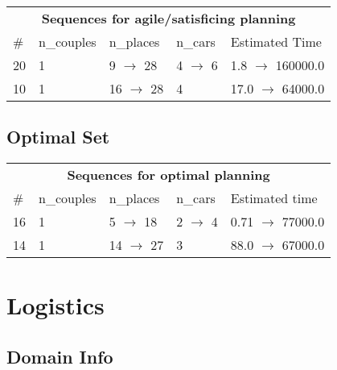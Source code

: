 \documentclass{article}
\begin{document}
                        \begin{center}
                        \begin{tabular}{l|l|l|l|l}
                        \multicolumn{5}{c}{\bf \large Sequences for agile/satisficing planning}\\
                        \# & n\_couples & n\_places & n\_cars & Estimated Time\\\midrule
                        20&1&9 $\rightarrow$ 28&4 $\rightarrow$ 6&1.8 $\rightarrow$ 160000.0\\
10&1&16 $\rightarrow$ 28&4&17.0 $\rightarrow$ 64000.0
                        \end{tabular}
                        \end{center}
                    
                            \subsection*{Optimal Set}

                            \begin{center}
                            \begin{tabular}{l|l|l|l|l}
                            \multicolumn{5}{c}{\bf \large Sequences for optimal planning}\\
                            \# & n\_couples & n\_places & n\_cars & Estimated time\\\midrule
                            16&1&5 $\rightarrow$ 18&2 $\rightarrow$ 4&0.71 $\rightarrow$ 77000.0\\
14&1&14 $\rightarrow$ 27&3&88.0 $\rightarrow$ 67000.0
                            \end{tabular}
                            \end{center}
                    \newpage \section{Logistics}
                    \subsection*{Domain Info}
\end{document}
